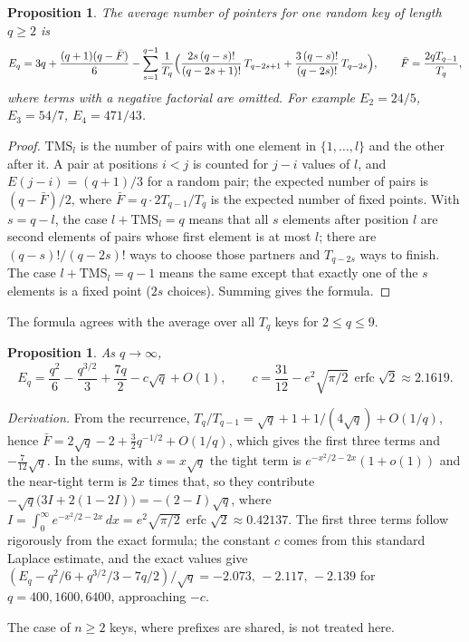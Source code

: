 \documentclass[11pt]{amsart}
\newtheorem{proposition}[theorem]{Proposition}
\theoremstyle{remark}
\begin{document}
\begin{proposition}
The average number of pointers for one random key of length $q\ge2$ is
\[E_q=3q+\frac{(q+1)(q-\bar F)}{6}-\sum_{s=1}^{q-1}\frac{1}{T_q}\Bigl(\frac{2s\,(q-s)!}{(q-2s+1)!}\,T_{q-2s+1}
+\frac{3\,(q-s)!}{(q-2s)!}\,T_{q-2s}\Bigr),\qquad \bar F=\frac{2qT_{q-1}}{T_q},\]
where terms with a negative factorial are omitted. For example $E_2=24/5$, $E_3=54/7$, $E_4=471/43$.
\end{proposition}
\begin{proof}
$\mathrm{TMS}_l$ is the number of pairs with one element in $\{1,\dots,l\}$ and the other after it. A pair at
positions $i<j$ is counted for $j-i$ values of $l$, and $E(j-i)=(q+1)/3$ for a random pair; the expected number of
pairs is $(q-\bar F)/2$, where $\bar F=q\cdot2T_{q-1}/T_q$ is the expected number of fixed points. With $s=q-l$,
the case $l+\mathrm{TMS}_l=q$ means that all $s$ elements after position $l$ are second elements of pairs whose
first element is at most $l$; there are $(q-s)!/(q-2s)!$ ways to choose those partners and $T_{q-2s}$ ways to finish.
The case $l+\mathrm{TMS}_l=q-1$ means the same except that exactly one of the $s$ elements is a fixed point ($2s$
choices). Summing gives the formula.
\end{proof}
The formula agrees with the average over all $T_q$ keys for $2\le q\le9$.

\begin{proposition}
As $q\to\infty$,
\[E_q=\frac{q^2}{6}-\frac{q^{3/2}}{3}+\frac{7q}{2}-c\sqrt q+O(1),\qquad
c=\frac{31}{12}-e^2\sqrt{\pi/2}\,\operatorname{erfc}\sqrt2\approx2.1619.\]
\end{proposition}
\noindent\emph{Derivation.} From the recurrence, $T_q/T_{q-1}=\sqrt q+1+1/(4\sqrt q)+O(1/q)$, hence
$\bar F=2\sqrt q-2+\frac32q^{-1/2}+O(1/q)$, which gives the first three terms and $-\frac7{12}\sqrt q$. In the sums,
with $s=x\sqrt q$ the tight term is $e^{-x^2/2-2x}(1+o(1))$ and the near-tight term is $2x$ times that, so they
contribute $-\sqrt q\bigl(3I+2(1-2I)\bigr)=-(2-I)\sqrt q$, where $I=\int_0^\infty e^{-x^2/2-2x}\,dx=
e^2\sqrt{\pi/2}\,\operatorname{erfc}\sqrt2\approx0.42137$. The first three terms follow rigorously from the exact
formula; the constant $c$ comes from this standard Laplace estimate, and the exact values give
$(E_q-q^2/6+q^{3/2}/3-7q/2)/\sqrt q=-2.073,\,-2.117,\,-2.139$ for $q=400,1600,6400$, approaching $-c$.

The case of $n\ge2$ keys, where prefixes are shared, is not treated here.
\end{document}
